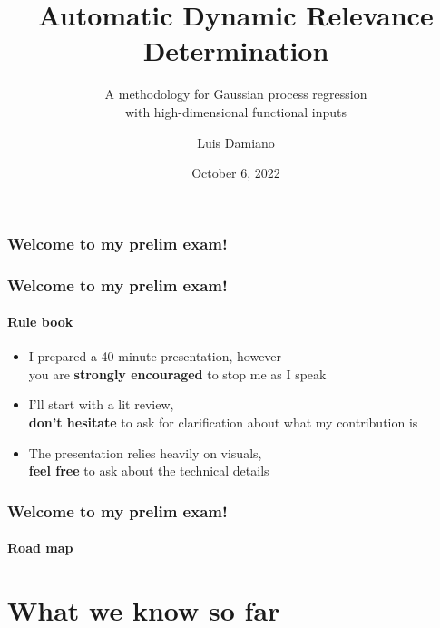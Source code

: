 \documentclass{snedecorbeamer}
\begin{document}
\title{Automatic Dynamic Relevance Determination}
\subtitle{A methodology for Gaussian process regression\\
  with high-dimensional functional inputs}
\author{Luis Damiano}
\date{October 6, 2022}

\begin{frame}
  \titlepage{}
\end{frame}

\begin{frame}
  \frametitle{Welcome to my prelim exam!}
\end{frame}

\begin{frame}
  \frametitle{Welcome to my prelim exam!}
  \framesubtitle{Rule book}

  \begin{itemize}[<+(1)->]
  \item I prepared a 40 minute presentation, however\\
  you are \textbf{strongly encouraged} to stop me as I speak
  \item I'll start with a lit review,\\
    \textbf{don't hesitate} to ask for clarification about what my contribution is
  \item The presentation relies heavily on visuals,\\
    \textbf{feel free} to ask about the technical details
  \end{itemize}
\end{frame}

\begin{frame}
  \frametitle{Welcome to my prelim exam!}
  \framesubtitle{Road map}

  \tableofcontents
\end{frame}

\section{What we know so far}
\end{document}
